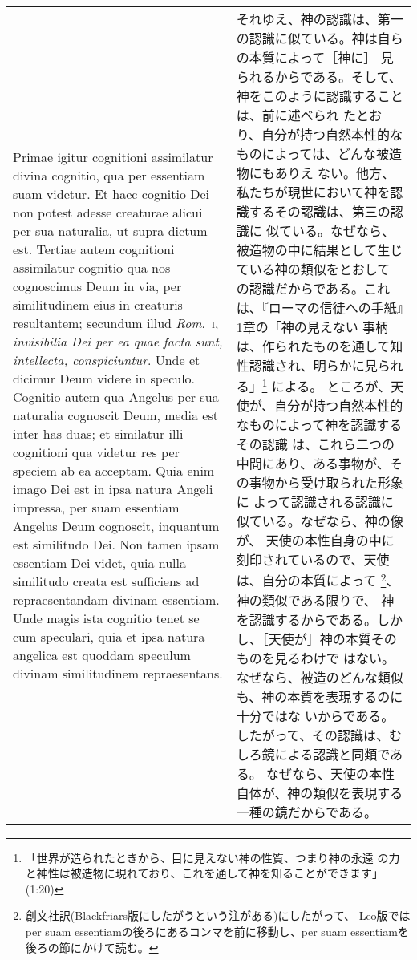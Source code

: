 \documentclass[10pt]{jsarticle} %
\begin{document}
\begin{longtable}{p{21em}p{21em}}
Primae igitur cognitioni
assimilatur divina cognitio, qua per essentiam suam videtur. Et haec
cognitio Dei non potest adesse creaturae alicui per sua naturalia, ut
supra dictum est. Tertiae autem cognitioni assimilatur cognitio qua nos
cognoscimus Deum in via, per similitudinem eius in creaturis
resultantem; secundum illud {\itshape Rom}.~{\scshape i}, {\itshape invisibilia Dei per ea quae facta
sunt, intellecta, conspiciuntur}. Unde et dicimur Deum videre in
speculo. Cognitio autem qua Angelus per sua naturalia cognoscit Deum,
media est inter has duas; et similatur illi cognitioni qua videtur res
per speciem ab ea acceptam. Quia enim imago Dei est in ipsa natura
Angeli impressa, per suam essentiam Angelus Deum cognoscit, inquantum
est similitudo Dei. Non tamen ipsam essentiam Dei videt, quia nulla
similitudo creata est sufficiens ad repraesentandam divinam
essentiam. Unde magis ista cognitio tenet se cum speculari, quia et ipsa
natura angelica est quoddam speculum divinam similitudinem
repraesentans.


&


それゆえ、神の認識は、第一の認識に似ている。神は自らの本質によって［神に］
 見られるからである。そして、神をこのように認識することは、前に述べられ
 たとおり、自分が持つ自然本性的なものによっては、どんな被造物にもありえ
 ない。他方、私たちが現世において神を認識するその認識は、第三の認識に
 似ている。なぜなら、被造物の中に結果として生じている神の類似をとおして
 の認識だからである。これは、『ローマの信徒への手紙』1章の「神の見えない
 事柄は、作られたものを通して知性認識され、明らかに見られる」\footnote{「世界が造られたときから、目に見えない神の性質、つまり神の永遠
 の力と神性は被造物に現れており、これを通して神を知ることができます」(1:20)}
による。
ところが、天使が、自分が持つ自然本性的なものによって神を認識するその認識
 は、これら二つの中間にあり、ある事物が、その事物から受け取られた形象に
 よって認識される認識に似ている。なぜなら、神の像が、
 天使の本性自身の中に刻印されているので、天使は、自分の本質によって
 \footnote{創文社訳(Blackfriars版にしたがうという注がある)にしたがって、
 Leo版ではper suam essentiamの後ろにあるコンマを前に移動し、per suam
 essentiamを後ろの節にかけて読む。}、神の類似である限りで、
 神を認識するからである。しかし、［天使が］神の本質そのものを見るわけで
 はない。なぜなら、被造のどんな類似も、神の本質を表現するのに十分ではな
 いからである。したがって、その認識は、むしろ鏡による認識と同類である。
 なぜなら、天使の本性自体が、神の類似を表現する一種の鏡だからである。

\\



\end{longtable}
\end{document}
